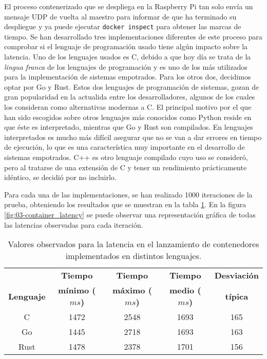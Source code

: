 El proceso contenerizado que se despliega en la Raspberry Pi tan solo envía un
mensaje UDP de vuelta al maestro para informar de que ha terminado su despliegue
y ya puede ejecutar \texttt{docker inspect} para obtener las marcas de tiempo.
Se han desarrollado tres implementaciones diferentes de este proceso para
comprobar si el lenguaje de programación usado tiene algún impacto sobre la
latencia. Uno de los lenguajes usados es C, debido a que hoy día se trata de la
\textit{lingua franca} de los lenguajes de programación y es uno de los más
utilizados para la implementación de sistemas empotrados. Para los otros dos,
decidimos optar por Go y Rust. Estos dos lenguajes de programación de sistemas,
gozan de gran popularidad en la actualida entre los desarrolladores, algunos de
los cuales los consideran como alternativas modernas a C. El principal motivo
por el que han sido escogidos sobre otros lenguajes más conocidos como Python
reside en que éste es interpretado, mientras que Go y Rust son compilados. En
lenguajes interpretados es mucho más difícil asegurar que no se van a dar
errores en tiempo de ejecución, lo que es una característica muy importante en
el desarrollo de sistemas empotrados. C++ es otro lenguaje compilado cuyo uso se
consideró, pero al tratarse de una extensión de C y tener un rendimiento
prácticamente idéntico, se decidió por no incluirlo.

Para cada una de las implementaciones, se han realizado 1000 iteraciones de la
prueba, obteniendo los resultados que se muestran en la tabla
\ref{tab:03-container_latency}. En la figura \ref{fig:03-container_latency} se
puede observar una representación gráfica de todas las latencias observadas para
cada iteración.

\begin{table}[H]
    \centering
    \begin{tabular}{ |c|c|c|c|c| }
        \hline
                          & \textbf{Tiempo}        & \textbf{Tiempo}        & \textbf{Tiempo}       & \textbf{Desviación} \\
        \textbf{Lenguaje} & \textbf{mínimo ($ms$)} & \textbf{máximo ($ms$)} & \textbf{medio ($ms$)} & \textbf{típica}     \\
        \hline
        C                 & 1472                   & 2548                   & 1693                  & 165                 \\
        \hline
        Go                & 1445                   & 2718                   & 1693                  & 163                 \\
        \hline
        Rust              & 1478                   & 2378                   & 1701                  & 156                 \\
        \hline
    \end{tabular}
    \caption{Valores observados para la latencia en el lanzamiento de
        contenedores implementados en distintos lenguajes.}
    \label{tab:03-container_latency}
\end{table}

